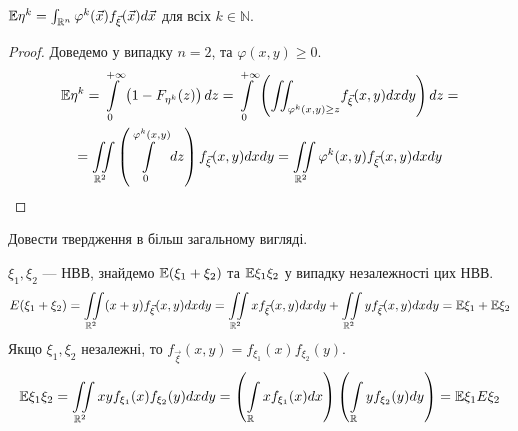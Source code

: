 \begin{proposition*} 
    $\mathbb{E}\eta^k = \int_{\mathbb{R}^n} \varphi^k(\vec{x}) f_{\vec{\xi}} (\vec{x}) d\vec{x}$ для всіх $k \in \mathbb{N}$.
\end{proposition*}
\begin{proof}
    Доведемо у випадку $n=2$, та $\varphi(x, y) \geq 0$.
    \begin{gather*}
        \mathbb{E}\eta^k = \int\limits_0^{+\infty} \left(1 - F_{\eta^k}(z)\right) dz = 
    \int\limits_0^{+\infty} \left({\iint_{\varphi^k(x,y) \geq z}} f_{\vec{\xi}}(x,y) dx dy\right) dz = \\
    =\iint\limits_{\mathbb{R}^2} \left( \int\limits_0^{\varphi^k(x,y)} dz\right) f_{\vec{\xi}}(x,y) dx dy = 
     \iint\limits_{\mathbb{R}^2} \varphi^k(x,y) f_{\vec{\xi}}(x,y) dx dy
    \end{gather*}
\end{proof}

\begin{exercise}
    Довести твердження в більш загальному вигляді.
\end{exercise}

\begin{example}\label{proof:expectation}
    $\xi_1, \xi_2$ --- НВВ, знайдемо $\mathbb{E}(\xi_1 + \xi_2)$ та $\mathbb{E}\xi_1\xi_2$
    у випадку незалежності цих НВВ.
    $$E(\xi_1 + \xi_2) = \iint\limits_{\mathbb{R}^2} (x+y) f_{\vec{\xi}}(x,y) dx dy = 
    \iint\limits_{\mathbb{R}^2} x f_{\vec{\xi}}(x,y) dx dy + 
    \iint\limits_{\mathbb{R}^2} y f_{\vec{\xi}}(x,y) dx dy = \mathbb{E}\xi_1 + \mathbb{E}\xi_2$$
    Якщо $\xi_1, \xi_2$ незалежні, то $f_{\vec{\xi}}(x,y) = f_{\xi_1}(x) f_{\xi_2}(y)$.
    $$\mathbb{E}\xi_1 \xi_2 =
    \iint\limits_{\mathbb{R}^2} xy f_{\xi_1}(x) f_{\xi_2}(y) dx dy =
    \left( \int\limits_{\mathbb{R}} x f_{\xi_1}(x) dx \right)
    \left( \int\limits_{\mathbb{R}} y f_{\xi_2}(y) dy \right) = \mathbb{E}\xi_1 E\xi_2$$
\end{example}